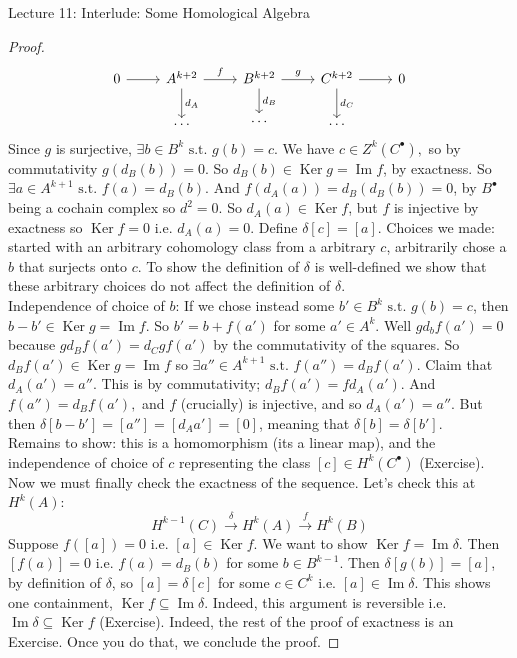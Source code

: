 \documentclass[10pt]{article}
\theoremstyle{plain}
\theoremstyle{definition}
\newcommand{\st}{\text{ s.t. }}
\newcommand{\ie}{\text{ i.e. }}
\DeclareMathOperator{\Ker}{Ker}
\DeclareMathOperator{\Ima}{Im}
\begin{document}
\begin{section}{Lecture 11: Interlude: Some Homological Algebra}
\begin{proof}
$$\begin{tikzcd}
0 \arrow[r] & A^{k+2} \arrow[r, "f"] \arrow[d, "d_A"]      & B^{k+2} \arrow[r, "g"] \arrow[d, "d_B"]                                  & C^{k+2} \arrow[r] \arrow[d, "d_C"]                & 0 \\
            & \dots                                        & \cdots                                                                   & \dots                                             &  
\end{tikzcd}$$
Since $g$ is surjective, $\exists b \in B^k \st g(b) = c.$ We have $c\in Z^k(C^\bullet),$ so by commutativity $g(d_B(b)) = 0$. So $d_B(b) \in \Ker g = \Ima f$, by exactness. So $\exists a \in A^{k+1} \st f(a) = d_B(b)$. And $f(d_A(a)) = d_B(d_B(b)) = 0$, by $B^\bullet$ being a cochain complex so $d^2 =0$. So $d_A(a) \in \Ker f$, but $f$ is injective by exactness so $\Ker f = 0$ i.e. $d_A(a) = 0$. Define $\delta [c] = [a]$. Choices we made: started with an arbitrary cohomology class from a arbitrary $c$, arbitrarily chose a $b$ that surjects onto $c$. To show the definition of $\delta$ is well-defined we show that these arbitrary choices do not affect the definition of $\delta$.\\
Independence of choice of $b$: If we chose instead some $b'\in B^k\st g(b) = c$, then $b-b' \in \Ker g = \Ima f$. So $b' = b + f(a')$ for some $a' \in A^k$. Well $gd_b f(a') = 0 $ because $g d_B f(a') = d_C g f(a')$ by the commutativity of the squares. So $d_B f(a') \in \Ker g = \Ima f$ so $\exists a'' \in A^{k+1} \st f(a'') = d_B f(a')$. Claim that $d_A(a') = a''.$ This is by commutativity; $d_B f(a') = f d_A(a')$. And $f(a'') = d_Bf(a'),$ and $f $ (crucially) is injective, and so $d_A(a') = a''$. But then $\delta [ b- b' ] = [ a''] = [d_A a'] = [ 0 ]$, meaning that $\delta[b] = \delta[b']$. \\
Remains to show: this is a homomorphism (its a linear map), and the independence of choice of $c$ representing the class $[c]\in H^k(C^\bullet)$ (Exercise).\\
Now we must finally check the exactness of the sequence. Let's check this at $H^k(A):$
$$H^{k-1}(C) \xrightarrow{\delta} H^k(A) \xrightarrow{f} H^k(B)$$
Suppose $f([a]) = 0$ i.e. $[a]\in\Ker f.$ We want to show $\Ker f = \Ima \delta$. Then $[f(a) ] = 0 \ie f(a) = d_B(b) $ for some $b\in B^{k-1}.$ Then $\delta[g(b)] = [a]$, by definition of $\delta$, so $[a] = \delta [c] $ for some $c\in C^k \ie [a]\in \Ima \delta$. This shows one containment, $\Ker f \subseteq \Ima \delta$. Indeed, this argument is reversible i.e. $\Ima \delta \subseteq \Ker f$ (Exercise). Indeed, the rest of the proof of exactness is an Exercise. Once you do that, we conclude the proof.

\end{proof}
\end{section}
\end{document}
